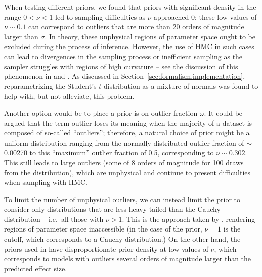 \documentclass[fleqn,usenatbib]{rasti}
\begin{document}

When testing different priors, we found that priors with significant density in
the range $0 < \nu < 1$ led to sampling difficulties as $\nu$ approached 0;
these low values of $\nu \sim 0.1$ can correspond to outliers that are more than
20 orders of magnitude larger than $\sigma$. In theory, these unphysical regions
of parameter space ought to be excluded during the process of inference.
However, the use of HMC in such cases can lead to divergences in the sampling
process or inefficient sampling as the sampler struggles with regions of high
curvature -- see the discussion of this phenomenon in \citet{Neal:2003} and
\citet{Betancourt:2013}. As discussed in
Section~\ref{sec:formalism.implementation}, reparametrizing the Student's
$t$-distribution as a mixture of normals was found to help with, but not
alleviate, this problem.

Another option would be to place a prior is on outlier fraction $\omega$. It
could be argued that the term outlier loses its meaning when the majority of a
dataset is composed of so-called ``outliers''; therefore, a natural choice of
prior might be a uniform distribution ranging from the normally-distributed
outlier fraction of $\sim$0.00270 to this ``maximum'' outlier fraction of 0.5,
corresponding to $\nu \sim 0.302$. This still leads to large outliers (some of 8
orders of magnitude for 100 draws from the distribution), which are unphysical
and continue to present difficulties when sampling with HMC.

To limit the number of unphysical outliers, we can instead limit the prior to
consider only distributions that are less heavy-tailed than the Cauchy
distribution -- i.e.\ all those with $\nu > 1$. This is the approach taken by
\citet{Gelman:2013}, rendering regions of parameter space inaccessible (in the
case of the \citet{Gelman:2013} prior, $\nu = 1$ is the cutoff, which
corresponds to a Cauchy distribution.) On the other hand, the priors used in
\citet{Juarez:2010, Ding:2014, Feeney:2018} have disproportionate prior density
at low values of $\nu$, which corresponds to models with outliers several orders
of magnitude larger than the predicted effect size.
\end{document}
